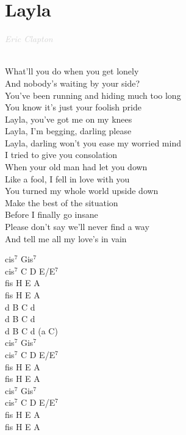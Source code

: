 \documentclass[a5paper, 10pt]{book}
\begin{document}
\section{Layla}\textcolor{lightgray}{\textit{ Eric Clapton}}\\~\\
\begin{minipage}[t]{0.7\textwidth}
What'll you do when you get lonely\\
And nobody's waiting by your side?\\
You've been running and hiding much too long\\
You know it's just your foolish pride\\

\hspace*{2mm} Layla, you've got me on my knees\\
\hspace*{2mm} Layla, I'm begging, darling please\\
\hspace*{2mm} Layla, darling won't you ease my worried mind\\

I tried to give you consolation\\
When your old man had let you down\\
Like a fool, I fell in love with you\\
You turned my whole world upside down\\

Make the best of the situation\\
Before I finally go insane\\
Please don't say we'll never find a way\\
And tell me all my love's in vain\\

\end{minipage}
\begin{minipage}[t]{0.3\textwidth}
cis$^7$  Gis$^7$  \\
cis$^7$  C  D  E/E$^7$  \\
fis  H  E  A  \\
fis  H  E  A  \\

d B C d\\
d B C d\\
d B C d (a C)\\

cis$^7$  Gis$^7$  \\
cis$^7$  C  D  E/E$^7$  \\
fis  H  E  A  \\
fis  H  E  A  \\

cis$^7$  Gis$^7$  \\
cis$^7$  C  D  E/E$^7$  \\
fis  H  E  A  \\
fis  H  E  A  \\

\end{minipage}
\end{document}
